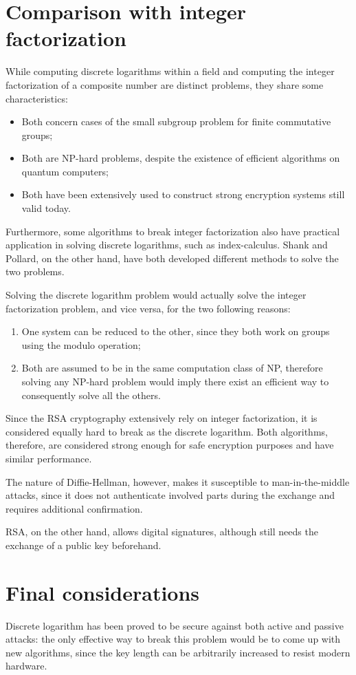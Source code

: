 \section{Comparison with integer factorization}
While computing discrete logarithms within a field and computing the integer factorization of a composite number are distinct problems, they share some characteristics:
\begin{itemize}
	\item Both concern cases of the small subgroup problem for finite commutative groups;
	\item Both are NP-hard problems, despite the existence of efficient algorithms on quantum computers;
	\item Both have been extensively used to construct strong encryption systems still valid today.
\end{itemize}

Furthermore, some algorithms to break integer factorization also have practical application in solving discrete logarithms, such as index-calculus. Shank and Pollard, on the other hand, have both developed different methods to solve the two problems.

Solving the discrete logarithm problem would actually solve the integer factorization problem, and vice versa, for the two following reasons:
\begin{enumerate}
	\item One system can be reduced to the other, since they both work on groups using the modulo operation;
	\item Both are assumed to be in the same computation class of NP, therefore solving any NP-hard problem would imply there exist an efficient way to consequently solve all the others.
\end{enumerate}

Since the RSA cryptography extensively rely on integer factorization, it is considered equally hard to break as the discrete logarithm. Both algorithms, therefore, are considered strong enough for safe encryption purposes and have similar performance.

The nature of Diffie-Hellman, however, makes it susceptible to man-in-the-middle attacks, since it does not authenticate involved parts during the exchange and requires additional confirmation.

RSA, on the other hand, allows digital signatures, although still needs the exchange of a public key beforehand. 

\section{Final considerations}
Discrete logarithm has been proved to be secure against both active and passive attacks: the only effective way to break this problem would be to come up with new algorithms, since the key length can be arbitrarily increased to resist modern hardware. 

